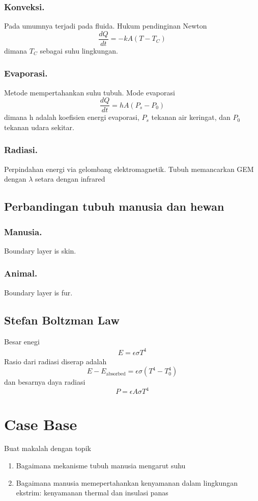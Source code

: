 \documentclass[../../../main.tex]{subfiles}
\begin{document}
\subsubsection{Konveksi.}
Pada umumnya terjadi pada fluida. Hukum pendinginan Newton 
\begin{equation*}
    \frac{dQ}{dt}=-kA(T-T_C)
\end{equation*}
dimana $T_C$ sebagai suhu lingkungan.
\subsubsection{Evaporasi.} Metode mempertahankan suhu tubuh. Mode evaporasi 
\begin{equation*}
    \frac{dQ}{dt}=hA(P_s-P_0)
\end{equation*}
dimana h adalah koefisien energi evaporasi, $P_s$ tekanan air keringat, dan $P_0$ tekanan udara sekitar.

\subsubsection{Radiasi.} Perpindahan energi via gelombang elektromagnetik. Tubuh memancarkan GEM dengan $\lambda$ setara dengan infrared

\subsection{Perbandingan tubuh manusia dan hewan}
\subsubsection{Manusia.} Boundary layer is skin.
\subsubsection{Animal.} Boundary layer is fur.

\subsection{Stefan Boltzman Law}
Besar enegi
\begin{eqnarray}
    E=\epsilon\sigma T^4
\end{eqnarray}
Rasio dari radiasi diserap adalah
\begin{equation*}
    E-E_{\text{absorbed}}=\epsilon \sigma (T^4-T_0^4)
\end{equation*}
dan besarnya daya radiasi 
\begin{equation*}
    P=\epsilon A \sigma T^4
\end{equation*}

\section{Case Base} Buat makalah dengan topik
\begin{enumerate}
\item Bagaimana mekanisme tubuh manusia mengarut suhu
\item Bagaimana manusia memepertahankan kenyamanan dalam lingkungan ekstrim: kenyamanan thermal dan insulasi panas
\end{enumerate}
\end{document}
